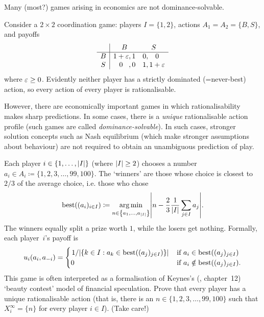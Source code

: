Many (most?) games arising in economics are not dominance-solvable.

\begin{example}
	\label{example:BoS}
	Consider a $2 \times 2$ coordination game: players $I=\{1,2\}$, actions $A_1 = A_2 = \{B,S\}$, and payoffs
	\begin{equation*}
		\begin{array}{c|cc}
			  & B        & S \\ \hline
			B & 1+\eps,1 & 0,\parbox{\widthof{$1+\eps$}}{\centering\vphantom{dp}$0$} \\
			S & \parbox{\widthof{$1+\eps$}}{\centering\vphantom{dp}$0$},0      & 1,1+\eps
		\end{array}
	\end{equation*}
	where $\varepsilon \geq 0$. Evidently neither player has a strictly dominated (=never-best) action, so every action of every player is rationalisable.
\end{example}

However, there are economically important games in which rationalisability makes sharp predictions. In some cases, there is a \emph{unique} rationalisable action profile (such games are called \emph{dominance-solvable}). In such cases, stronger solution concepts such as Nash equilibrium (which make stronger assumptions about behaviour) are not required to obtain an unambiguous prediction of play.

\begin{exercise}
	\label{exercise:nagel}
	Each player $i \in \{1,\dots,\abs*{I}\}$ (where $\abs*{I} \geq 2$) chooses a number $a_i \in A_i \coloneqq \{1,2,3,\dots,99,100\}$. The `winners' are those whose choice is closest to $2/3$ of the average choice, i.e. those who chose
	\begin{equation*}
		\text{best}((a_i)_{i \in I})
		\coloneqq \argmin_{n \in \left\{a_1,\dots,a_{\abs*{I}}\right\}}
		\abs*{ n - \frac{2}{3} \frac{1}{\abs*{I}} \sum_{j \in I} a_j } .
	\end{equation*}
	The winners equally split a prize worth $1$, while the losers get nothing. Formally, each player~$i$'s payoff is
	\begin{equation*}
		u_i(a_i,a_{-i})
		= \begin{cases}
			\left. 1 \middle/ \abs*{ \left\{ k \in I : a_k \in \text{best}\left((a_j)_{j \in I}\right) \right\} } \right.
			& \text{if $a_i \in \text{best}\left((a_j)_{j \in I}\right)$}
			\\
			0
			& \text{if $a_i \notin \text{best}\left((a_j)_{j \in I}\right)$.}
		\end{cases}
	\end{equation*}
	This game is often interpreted as a formalisation of Keynes's (\citeyear{Keynes1936}, chapter~12) `beauty contest' model of financial speculation.
	Prove that every player has a unique rationalisable action (that is, there is an $n \in \{1,2,3,\dots,99,100\}$ such that $X^\infty_i = \{n\}$ for every player $i \in I$). (Take care!)
\end{exercise}


